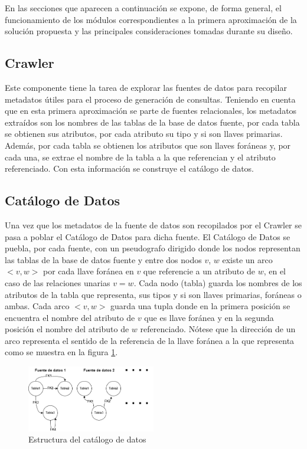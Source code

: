 En las secciones que aparecen a continuación se expone, de forma general, el funcionamiento de los módulos correspondientes a la primera 
aproximación de la solución propuesta y las principales consideraciones tomadas durante
su diseño.

\subsection{Crawler}

Este componente tiene la tarea de explorar las fuentes de datos para recopilar metadatos \'utiles para el proceso de generación
de consultas. Teniendo en cuenta que en esta primera aproximación se parte de fuentes relacionales, los metadatos extra\'idos son 
los nombres de las tablas de la base de datos fuente, por cada tabla se obtienen sus 
atributos, por cada atributo su tipo y si son llaves primarias. Además, por cada tabla se obtienen los atributos que son llaves 
for\'aneas y, por cada una, se extrae el nombre de la tabla a la que referencian y el atributo referenciado. Con esta información se construye 
el catálogo de datos.

\subsection{Catálogo de Datos}

Una vez que los metadatos de la fuente de datos son recopilados por el Crawler se pasa a poblar el Catálogo de Datos para dicha fuente. 
El Cat\'alogo de Datos se puebla, por cada fuente, 
con un pseudografo dirigido donde los nodos representan las tablas de la base de datos fuente y entre dos nodos $v$, $w$ 
existe un arco $<v,w>$ por cada llave for\'anea en $v$ que referencie a un atributo de $w$, en el caso de las relaciones unarias $v=w$. Cada nodo 
(tabla) guarda los nombres de los atributos de la tabla que representa, sus tipos y si son llaves primarias, for\'aneas o ambas. Cada arco $<v,w>$ 
guarda una tupla donde en la primera posición se encuentra el nombre del atributo de $v$ que es llave for\'anea y en la segunda 
posición el nombre del atributo de $w$ referenciado. Nótese que la dirección de un arco representa el sentido de la 
referencia de la llave for\'anea a la que representa como se muestra en la figura \ref{fig:datacatalogproposal}.

\begin{figure}[H]
    \centering
    \includegraphics[width=0.5\textwidth]{Graphics/data_catalog.drawio.png}
    \caption{Estructura del catálogo de datos}
    \label{fig:datacatalogproposal}
\end{figure}

